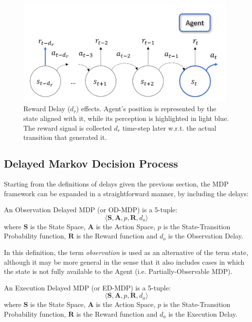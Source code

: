 \begin{figure}
                \includegraphics[width=11cm, keepaspectratio]{images/dmdp/r_delay.png}
                \caption{Reward Delay ($d_r$) effects. Agent's position is represented by the state aligned with it, while its perception is highlighted in light blue. The reward signal is collected $d_r$ time-step later w.r.t. the actual transition that generated it.}
                \label{fig:r_delay}
                
            \end{figure}
            
        \subsection{Delayed Markov Decision Process}
            Starting from the definitions of delays given the previous section, the MDP framework can be expanded in a straightforward manner, by including the delays:
            
            \begin{definition}
                \label{def:odmdp}
                An Observation Delayed MDP (or OD-MDP) is a 5-tuple:
                \[ \langle \mathbf{S}, \mathbf{A}, p, \mathbf{R}, d_o \rangle\]
                where $\mathbf{S}$ is the State Space, $\mathbf{A}$ is the Action Space, $p$ is the State-Transition Probability function, $\mathbf{R}$ is the Reward function and $d_o$ is the Observation Delay.
            \end{definition}
            \noindent
            In this definition, the term \textit{observation} is used as an alternative of the term state, although it may be more general in the sense that it also includes cases in which the state is not fully available to the Agent (i.e. Partially-Observable MDP).
            
            \begin{definition}
                \label{def:edmdp}
                An Execution Delayed MDP (or ED-MDP) is a 5-tuple:
                \[ \langle \mathbf{S}, \mathbf{A}, p, \mathbf{R}, d_a \rangle\]
                where $\mathbf{S}$ is the State Space, $\mathbf{A}$ is the Action Space, $p$ is the State-Transition Probability function, $\mathbf{R}$ is the Reward function and $d_a$ is the Execution Delay.
            \end{definition}
            
